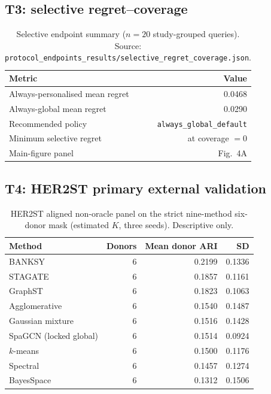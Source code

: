 \documentclass[11pt]{article}
\begin{document}
\subsection{T3: selective regret--coverage}

\begin{table}[ht]
\centering
\caption{Selective endpoint summary ($n=20$ study-grouped queries).
Source: \texttt{protocol\_endpoints\_results/selective\_regret\_coverage.json}.
\label{tab:si-selective}}
\begin{tabular}{@{}lr@{}}
\toprule
Metric & Value \\
\midrule
Always-personalised mean regret & 0.0468 \\
Always-global mean regret & 0.0290 \\
Recommended policy & \texttt{always\_global\_default} \\
Minimum selective regret & at coverage $=0$ \\
Main-figure panel & Fig.~4A \\
\bottomrule
\end{tabular}
\end{table}

\subsection{T4: HER2ST primary external validation}

\begin{table}[ht]
\centering
\caption{HER2ST aligned non-oracle panel on the strict nine-method six-donor
mask (estimated \(K\), three seeds). Descriptive only.
\label{tab:si-her2-methods}}
\begin{tabular}{@{}lrrr@{}}
\toprule
Method & Donors & Mean donor ARI & SD \\
\midrule
BANKSY & 6 & 0.2199 & 0.1336 \\
STAGATE & 6 & 0.1857 & 0.1161 \\
GraphST & 6 & 0.1823 & 0.1063 \\
Agglomerative & 6 & 0.1540 & 0.1487 \\
Gaussian mixture & 6 & 0.1516 & 0.1428 \\
SpaGCN (locked global) & 6 & 0.1514 & 0.0924 \\
\(k\)-means & 6 & 0.1500 & 0.1176 \\
Spectral & 6 & 0.1457 & 0.1274 \\
BayesSpace & 6 & 0.1312 & 0.1506 \\
\bottomrule
\end{tabular}
\end{table}
\end{document}
